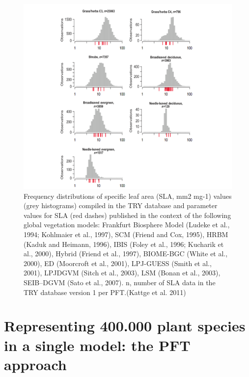 \documentclass[
  12pt,
  oneside]{book}
\begin{document}
\begin{figure}

{\centering \includegraphics[width=0.8\linewidth]{figures/chap7/f711_try_models} 

}

\caption{Frequency distributions of specific leaf area (SLA, mm2 mg-1) values (grey histograms) compiled in the TRY database and parameter values for SLA (red dashes) published in the context of the following global vegetation models: Frankfurt Biosphere Model (Ludeke et al., 1994; Kohlmaier et al., 1997), SCM (Friend and Cox, 1995), HRBM (Kaduk and Heimann, 1996), IBIS (Foley et al., 1996; Kucharik et al., 2000), Hybrid (Friend et al., 1997), BIOME-BGC (White et al., 2000), ED (Moorcroft et al., 2001), LPJ-GUESS (Smith et al., 2001), LPJDGVM (Sitch et al., 2003), LSM (Bonan et al., 2003), SEIB–DGVM (Sato et al., 2007). n, number of SLA data in the TRY database version 1 per PFT.(Kattge et al. 2011)}\label{fig:f711}
\end{figure}

\hypertarget{representing-400.000-plant-species-in-a-single-model-the-pft-approach}{%
\section{Representing 400.000 plant species in a single model: the PFT approach}\label{representing-400.000-plant-species-in-a-single-model-the-pft-approach}}
\end{document}
